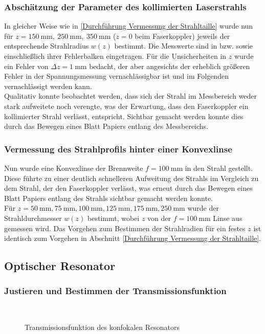 \documentclass[11pt,a4paper,oneside]{scrartcl}
\begin{document}
\subsubsection{Abschätzung der Parameter des kollimierten Laserstrahls}
In gleicher Weise wie in \ref{Durchführung Vermessung der Strahltaille} wurde nun für $z=150\ \mathrm{mm},\ 250\ \mathrm{mm},\ 350\ \mathrm{mm}$ ($z=0$ beim Faserkoppler) jeweils der entsprechende Strahlradius $w(z)$ bestimmt. Die Messwerte sind in  bzw.  sowie  einschließlich ihrer Fehlerbalken eingetragen. Für die Unsicherheiten in $z$ wurde ein Fehler von $\Delta z=1\ \mathrm{mm}$ bedacht, der aber angesichts der erheblich größeren Fehler in der Spannungsmessung vernachlässigbar ist und im Folgenden vernachlässigt werden kann.\\
Qualitativ konnte beobachtet werden, dass sich der Strahl im Messbereich weder stark aufweitete noch verengte, was der Erwartung, dass den Faserkoppler ein kollimierter Strahl verlässt, entspricht. Sichtbar gemacht werden konnte dies durch das Bewegen eines Blatt Papiers entlang des Messbereichs.
\subsubsection{Vermessung des Strahlprofils hinter einer Konvexlinse}
Nun wurde eine Konvexlinse der Brennweite $f=100\ \mathrm{mm}$ in den Strahl gestellt. Diese führte zu einer deutlich schnelleren Aufweitung des Strahls im Vergleich zu dem Strahl, der den Faserkoppler verlässt, was erneut durch das Bewegen eines Blatt Papiers entlang des Strahls sichtbar gemacht werden konnte. \\
Für $z=50\ \mathrm{mm},75\ \mathrm{mm},100\ \mathrm{mm},125\ \mathrm{mm},175\ \mathrm{mm}, 250\ \mathrm{mm}$ wurde der Strahldurchmesser $w(z)$ bestimmt, wobei $z$ von der $f=100\ \mathrm{mm}$ Linse aus gemessen wird. Das Vorgehen zum Bestimmen der Strahlradien für ein festes $z$ ist identisch zum Vorgehen in Abschnitt \ref{Durchführung Vermessung der Strahltaille}.
\subsection{Optischer Resonator}

\subsubsection{Justieren und Bestimmen der Transmissionsfunktion}
\setcounter{figure}{5}
\begin{figure}[H]
    \centering
  \\
   \caption{Transmissionsfunktion des konfokalen Resonators}
    \label{FotostreckeTransmissionsfunktion}
\end{figure}
\end{document}
